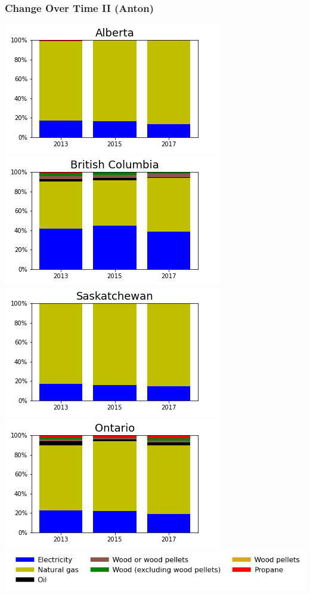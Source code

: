 \documentclass{beamer}
\begin{document}
\begin{frame}
\frametitle{Change Over Time II (Anton)}
\vspace{-10pt}
\begin{center}
\includegraphics[width=0.48\linewidth]{ab.png}%
\includegraphics[width=0.48\linewidth]{bc.png}\\
\includegraphics[width=0.48\linewidth]{sk.png}%
\includegraphics[width=0.48\linewidth]{on.png}\\
\includegraphics[width=0.8\linewidth]{leg_bar.png}
\end{center}
\end{frame}
\end{document}
